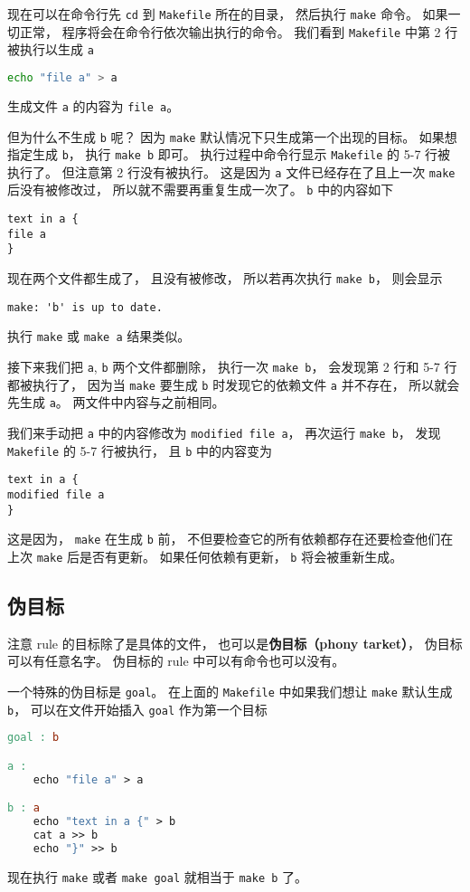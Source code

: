 现在可以在命令行先 \verb`cd` 到 \verb`Makefile` 所在的目录， 然后执行 \verb`make` 命令。 如果一切正常， 程序将会在命令行依次输出执行的命令。 我们看到 \verb`Makefile` 中第 2 行被执行以生成 \verb`a`
\begin{lstlisting}[language=bash]
echo "file a" > a
\end{lstlisting}
生成文件 \verb`a` 的内容为 \verb`file a`。

但为什么不生成 \verb`b` 呢？ 因为 \verb`make` 默认情况下只生成第一个出现的目标。 如果想指定生成 \verb`b`， 执行 \verb`make b` 即可。 执行过程中命令行显示 \verb`Makefile` 的 5-7 行被执行了。 但注意第 2 行没有被执行。 这是因为 \verb`a` 文件已经存在了且上一次 \verb`make` 后没有被修改过， 所以就不需要再重复生成一次了。 \verb`b` 中的内容如下
\begin{lstlisting}[language=none]
text in a {
file a
}
\end{lstlisting}

现在两个文件都生成了， 且没有被修改， 所以若再次执行 \verb`make b`， 则会显示
\begin{lstlisting}[language=none]
make: 'b' is up to date.
\end{lstlisting}
执行 \verb`make` 或 \verb`make a` 结果类似。

接下来我们把 \verb`a`, \verb`b` 两个文件都删除， 执行一次 \verb`make b`， 会发现第 2 行和 5-7 行都被执行了， 因为当 \verb`make` 要生成 \verb`b` 时发现它的依赖文件 \verb`a` 并不存在， 所以就会先生成 \verb`a`。 两文件中内容与之前相同。

我们来手动把 \verb`a` 中的内容修改为 \verb`modified file a`， 再次运行 \verb`make b`， 发现 \verb`Makefile` 的 5-7 行被执行， 且 \verb`b` 中的内容变为
\begin{lstlisting}[language=none]
text in a {
modified file a
}
\end{lstlisting}
这是因为， \verb`make` 在生成 \verb`b` 前， 不但要检查它的所有依赖都存在还要检查他们在上次 \verb`make` 后是否有更新。 如果任何依赖有更新， \verb`b` 将会被重新生成。

\subsection{伪目标}
注意 rule 的目标除了是具体的文件， 也可以是\textbf{伪目标（phony tarket）}， 伪目标可以有任意名字。 伪目标的 rule 中可以有命令也可以没有。

一个特殊的伪目标是 \verb`goal`。 在上面的 \verb`Makefile` 中如果我们想让 \verb`make` 默认生成 \verb`b`， 可以在文件开始插入 \verb`goal` 作为第一个目标
\begin{lstlisting}[language=makefile]
goal : b

a :
	echo "file a" > a

b : a
	echo "text in a {" > b
	cat a >> b
	echo "}" >> b
\end{lstlisting}
现在执行 \verb`make` 或者 \verb`make goal` 就相当于 \verb`make b` 了。

